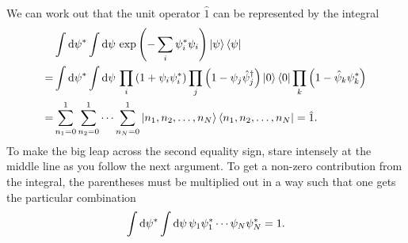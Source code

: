 We can work out that the unit operator $\hat{1}$ can be represented by the integral
\begin{equation}
\begin{split}
	 \iffalse
	 & \int \dif \conj{\psi} \int \dif \psi \, e^{-\sum_i \conj\psi_i \psi_i} \ket{\psi} \bra{\psi} \\
	=& \int \dif \conj{\psi} \int \dif \psi \, \prod_i \left( 1 + \psi_i \conj{\psi}_i \right) \prod_j \left( 1 - \psi_j \creat_j \right) \ket{0} \bra{0} \prod_k \left( 1 - \destr_k \conj\psi_k \right) \\
	=& \int \dif \conj{\psi} \int \dif \psi \, \prod_i \left( 1 + \psi_i \conj{\psi}_i \right) \prod_j \left( 1 - \psi_j \creat_j \right) \ket{0} \bra{0} \left( 1 - \destr_j \conj\psi_j \right) \\
	=& \sum_{n_1=0}^1 \sum_{n_2=0}^1\cdots \sum_{n_N=0}^1 \ket{n_1, n_2, \ldots, n_N} \bra{n_1, n_2, \ldots, n_N} = \hat{1} \\
	=& \int \dif \conj{\psi} \int \dif \psi \left[ \left( -\sum_i \conj{\psi}_i \psi_i \right) \ket{0} \bra{0} + \left( -\sum_j \psi_j \creat_j \right) \ket{0} \bra{0} \left( -\sum_k \destr_k \conj\psi_k \right) \right] \\
	=& \int \dif \conj{\psi} \int \dif \psi \left[ \sum_i \psi_i \conj\psi_i \ket{0} \bra{0} + \sum_{j,k} \psi_j \conj\psi_k \ket{1_j} \bra{1_k} \right] \\
	=& \ket{0} \bra{0} + \sum_j \ket{1_j} \bra{1_j} = \hat{1} . \\
	\fi
	 & \int \dif \conj{\psi} \int \dif \psi \, \exp \left( -\sum_i \conj\psi_i \psi_i \right) \ket{\psi} \bra{\psi} \\
	=& \int \dif \conj{\psi} \int \dif \psi \, \prod_i \left( 1 + \psi_i \conj{\psi}_i \right) \prod_j \left( 1 - \psi_j \creat_j \right) \ket{0} \bra{0} \prod_k \left( 1 - \destr_k \conj\psi_k \right) \\
	=& \sum_{n_1=0}^1 \sum_{n_2=0}^1\cdots \sum_{n_N=0}^1 \ket{n_1, n_2, \ldots, n_N} \bra{n_1, n_2, \ldots, n_N} = \hat{1} . \\
\end{split}
\end{equation}
To make the big leap across the second equality sign, stare intensely at the middle line as you follow the next argument.
To get a non-zero contribution from the integral, the parentheses must be multiplied out in a way such that one gets the particular combination
\begin{equation}
	\int \mathop{}\!\mathrm{d} {\psi}^* \int \mathop{}\!\mathrm{d} \psi \, \psi_1 {\psi}^*_1 \cdots \psi_N {\psi}^*_N = 1 .
\end{equation}
